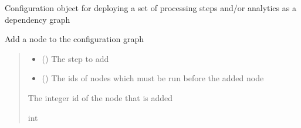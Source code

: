 \documentclass[letterpaper,10pt,english]{sphinxmanual}
\begin{document}
\begin{fulllineitems}
\sphinxAtStartPar
Configuration object for deploying a set of processing steps and/or analytics as a dependency graph

\begin{fulllineitems}
\label{\detokenize{aisquared.config:aisquared.config.GraphConfiguration.GraphConfiguration.add_node}}
\pysigstartsignatures
{}
\pysigstopsignatures
\sphinxAtStartPar
Add a node to the configuration graph
\begin{quote}\begin{description}
\begin{itemize}
\item {} 
\sphinxAtStartPar
{} () \textendash{} The step to add

\item {} 
\sphinxAtStartPar
{} (\sphinxstyleliteralemphasis{\sphinxupquote{, }}) \textendash{} The ids of nodes which must be run before the
added node

\end{itemize}

\sphinxAtStartPar
{} \textendash{} The integer id of the node that is added

\sphinxAtStartPar
int

\end{description}\end{quote}


\end{fulllineitems}
\end{fulllineitems}
\end{document}
